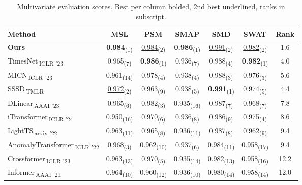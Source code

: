 \begin{table}[htbp]
\centering
\caption{Multivariate evaluation scores. Best per column bolded, 2nd best underlined, ranks in subscript.}
\begin{tabular}{l|ccccc|c}
\toprule
Method & MSL & PSM & SMAP & SMD & SWAT & Rank \\
\midrule
\textbf{Ours} & \textbf{0.984}\textsubscript{(1)} & \underline{0.984}\textsubscript{(2)} & \textbf{0.986}\textsubscript{(1)} & \underline{0.991}\textsubscript{(2)} & \underline{0.982}\textsubscript{(2)} & 1.6 \\
\midrule
TimesNet\,\textsubscript{ICLR '23} & 0.965\textsubscript{(7)} & \textbf{0.986}\textsubscript{(1)} & 0.936\textsubscript{(7)} & 0.988\textsubscript{(4)} & \textbf{0.982}\textsubscript{(1)} & 4.0 \\
MICN\,\textsubscript{ICLR '23} & 0.961\textsubscript{(14)} & 0.978\textsubscript{(4)} & 0.938\textsubscript{(4)} & 0.988\textsubscript{(3)} & 0.976\textsubscript{(3)} & 5.6 \\
SSSD\,\textsubscript{TMLR} & \underline{0.972}\textsubscript{(2)} & 0.963\textsubscript{(9)} & 0.938\textsubscript{(5)} & \textbf{0.991}\textsubscript{(1)} & 0.974\textsubscript{(5)} & 4.4 \\
DLinear\,\textsubscript{AAAI '23} & 0.965\textsubscript{(6)} & 0.982\textsubscript{(3)} & 0.935\textsubscript{(16)} & 0.987\textsubscript{(7)} & 0.968\textsubscript{(7)} & 7.8 \\
iTransformer\,\textsubscript{ICLR '24} & 0.950\textsubscript{(16)} & 0.970\textsubscript{(6)} & 0.936\textsubscript{(8)} & 0.986\textsubscript{(9)} & 0.975\textsubscript{(4)} & 8.6 \\
LightTS\,\textsubscript{arxiv '22} & 0.963\textsubscript{(11)} & 0.965\textsubscript{(8)} & 0.936\textsubscript{(11)} & 0.987\textsubscript{(8)} & 0.962\textsubscript{(9)} & 9.4 \\
AnomalyTransformer\,\textsubscript{ICLR '22} & 0.968\textsubscript{(3)} & 0.962\textsubscript{(10)} & 0.937\textsubscript{(6)} & 0.984\textsubscript{(11)} & 0.958\textsubscript{(17)} & 9.4 \\
Crossformer\,\textsubscript{ICLR '23} & 0.963\textsubscript{(13)} & 0.970\textsubscript{(5)} & 0.935\textsubscript{(14)} & 0.982\textsubscript{(13)} & 0.958\textsubscript{(16)} & 12.2 \\
Informer\,\textsubscript{AAAI '21} & 0.964\textsubscript{(10)} & 0.960\textsubscript{(12)} & 0.936\textsubscript{(10)} & 0.980\textsubscript{(14)} & 0.958\textsubscript{(14)} & 12.0 \\

\end{tabular}
\end{table}

